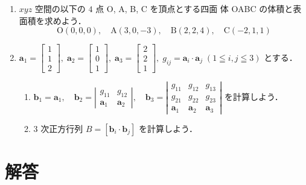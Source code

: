 \documentclass[11pt, uplatex, dvipdfmx]{jsarticle}
\begin{document}
\begin{enumerate}
\item $xyz$ 空間の以下の $4$ 点 O, A, B, C を頂点とする四面
  体 OABC の体積と表面積を求めよう．
  \[
    \textrm{O}(0,0,0), \quad \textrm{A}(3,0,-3), \quad \textrm{B}(2,2,4), \quad \textrm{C}(-2,1,1)
  \]


\item $\bm{a}_1=\left[
    \begin{array}{r}
      1\\
      1\\
      2
    \end{array}
  \right], \; \bm{a}_2=\left[
    \begin{array}{r}
      1\\
      0\\
      1
    \end{array}
  \right], \; \bm{a}_3=\left[
    \begin{array}{r}
      2\\
      2\\
      1
    \end{array}
  \right], \; g_{ij} = \bm{a}_i \cdot \bm{a}_j \; (1 \leqq i,j \leqq 3)$ とする．

  \vspace{1zh}

  \begin{enumerate}[(1)]
    \setlength{\itemsep}{1ex}
    
  \item $\bm{b}_1 = \bm{a}_1, \quad \bm{b}_2= \left|
      \begin{array}{cc}
        g_{11} & g_{12}\\
        \bm{a}_1 & \bm{a}_2
      \end{array}
    \right|, \quad \bm{b}_3 = \left|
      \begin{array}{ccc}
        g_{11} & g_{12} & g_{13}\\
        g_{21} & g_{22} & g_{23}\\
        \bm{a}_1 & \bm{a}_2 & \bm{a}_3
      \end{array}
    \right|$ を計算しよう．

  \item $3$ 次正方行列 $B=\left[ \bm{b}_i \cdot \bm{b}_j\right]$ を計算しよう．
  \end{enumerate}
\end{enumerate}

\newpage

\section*{解答}
\end{document}
